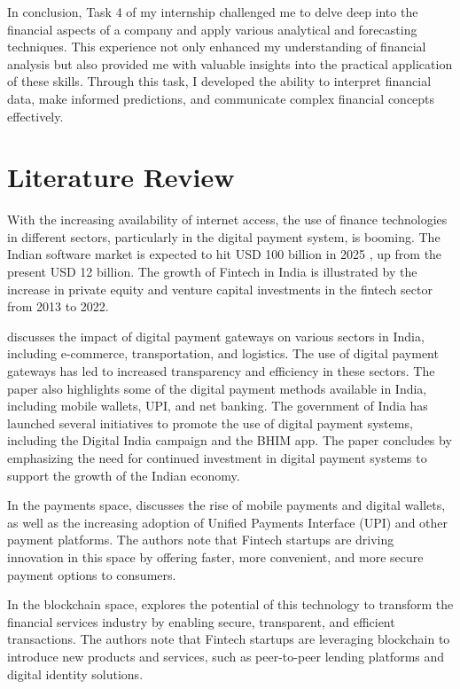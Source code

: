 In conclusion, Task 4 of my internship challenged me to delve deep into the financial aspects of a company and apply various analytical and forecasting techniques. This experience not only enhanced my understanding of financial analysis but also provided me with valuable insights into the practical application of these skills. Through this task, I developed the ability to interpret financial data, make informed predictions, and communicate complex financial concepts effectively.

\section{Literature Review}

With the increasing availability of internet access, the use of finance technologies in different sectors, particularly in the digital payment system, is booming. The Indian software market is expected to hit USD 100 billion in 2025 , up from the present USD 12 billion. The growth of Fintech in India is illustrated by the increase in private equity and venture capital investments in the fintech sector from 2013 to 2022.

\citep{bhide2019growth} discusses the impact of digital payment gateways on various sectors in India, including e-commerce, transportation, and logistics. The use of digital payment gateways has led to increased transparency and efficiency in these sectors. The paper also highlights some of the digital payment methods available in India, including mobile wallets, UPI, and net banking. The government of India has launched several initiatives to promote the use of digital payment systems, including the Digital India campaign and the BHIM app. The paper concludes by emphasizing the need for continued investment in digital payment systems to support the growth of the Indian economy.

In the payments space,  discusses the rise of mobile payments and digital wallets, as well as the increasing adoption of Unified Payments Interface (UPI) and other payment platforms. The authors note that Fintech startups are driving innovation in this space by offering faster, more convenient, and more secure payment options to consumers. 

In the blockchain space, \citep{durga2023study} explores the potential of this technology to transform the financial services industry by enabling secure, transparent, and efficient transactions. The authors note that Fintech startups are leveraging blockchain to introduce new products and services, such as peer-to-peer lending platforms and digital identity solutions. 

